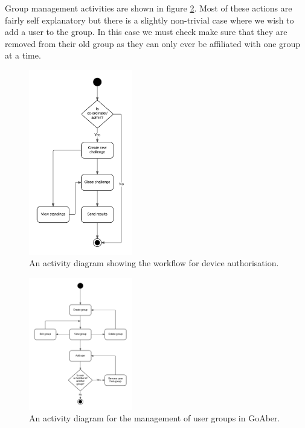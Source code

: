 Group management activities are shown in figure \ref{fig:activity-diagram-group-management}. Most of these actions are fairly self explanatory but there is a slightly non-trivial case where we wish to add a user to the group. In this case we must check make sure that they are removed from their old group as they can only ever be affiliated with one group at a time.

\begin{figure}[H]
\centering
\includegraphics[width=0.4\textwidth]{../design/UML/StateActivity/Creating-Closing-Challenges.png}
\caption{An activity diagram showing the workflow for device authorisation.}
\label{fig:activity-diagram-device-authorisation}
\end{figure}

\begin{figure}[H]
\centering
\includegraphics[width=0.4\textwidth]{../design/UML/StateActivity/Groups-Management.png}
\caption{An activity diagram for the management of user groups in GoAber.}
\label{fig:activity-diagram-group-management}
\end{figure}

